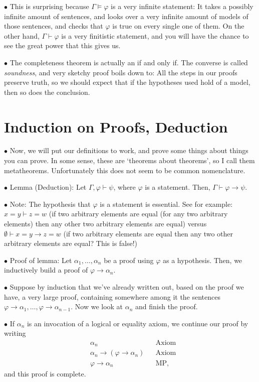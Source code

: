 \documentclass{article}
\newcommand\point[1]{\noindent \hspace{\labelsep} $\bullet$ #1 \smallskip}
\begin{document}
\point{This is surprising because $\Gamma \vDash \varphi$ is a very infinite statement: It takes a possibly infinite amount of sentences, and looks over a very infinite amount of models of those sentences, and checks that $\varphi$ is true on every single one of them. On the other hand, $\Gamma \vdash \varphi$ is a very finitistic statement, and you will have the chance to see the great power that this gives us.}

\point{The completeness theorem is actually an if and only if. The converse is called \emph{soundness}, and very sketchy proof boils down to: All the steps in our proofs preserve truth, so we should expect that if the hypotheses used hold of a model, then so does the conclusion.}

\section{Induction on Proofs, Deduction}

\point{Now, we will put our definitions to work, and prove some things about things you can prove. In some sense, these are `theorems about theorems', so I call them metatheorems. Unfortunately this does not seem to be common nomenclature.}

\point{Lemma (Deduction): Let $\Gamma, \varphi \vdash \psi$, where $\varphi$ is a statement. Then, $\Gamma \vdash \varphi \rightarrow \psi$.}

\point{Note: The hypothesis that $\varphi$ is a statement is essential. See for example: $x = y \vdash z = w$ (if two arbitrary elements are equal (for any two arbitrary elements) then any other two arbitrary elements are equal) versus $\emptyset \vdash x=y \rightarrow z=w$ (if two arbitrary elements are equal then any two other arbitrary elements are equal? This is false!)}

\point{Proof of lemma: Let $\alpha_1, \dots, \alpha_n$ be a proof using $\varphi$ as a hypothesis. Then, we inductively build a proof of $\varphi \rightarrow \alpha_n$.}

\point{Suppose by induction that we've already written out, based on the proof we have, a very large proof, containing somewhere among it the sentences $\varphi \rightarrow \alpha_1, \dots, \varphi \rightarrow \alpha_{n-1}$. Now we look at $\alpha_n$ and finish the proof.}

\point{If $\alpha_n$ is an invocation of a logical or equality axiom, we continue our proof by writing
\begin{equation}
\begin{aligned}
&\alpha_n && \text{Axiom}\\
&\alpha_n \rightarrow (\varphi \rightarrow \alpha_n) && \text{Axiom}\\
&\varphi \rightarrow \alpha_n && \text{MP},
\end{aligned}
\end{equation}
and this proof is complete.}
\end{document}

